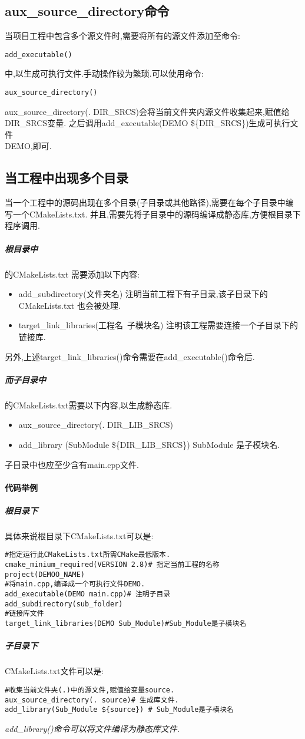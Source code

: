 \documentclass{ctexart}
\begin{document}
\subsection{aux\_source\_directory命令}
当项目工程中包含多个源文件时,需要将所有的源文件添加至命令:
\begin{verbatim}
add_executable()
\end{verbatim}
中,以生成可执行文件.手动操作较为繁琐.可以使用命令:
\begin{verbatim}
aux_source_directory()
\end{verbatim}
aux\_source\_directory(. DIR\_SRCS)会将当前文件夹内源文件收集起来,赋值给DIR\_SRCS变量.
之后调用add\_executable(DEMO \$\{DIR\_SRCS\})生成可执行文件\\DEMO,即可.
\subsection{当工程中出现多个目录}
当一个工程中的源码出现在多个目录(子目录或其他路径),需要在每个子目录中编写一个CMakeLists.txt. 并且,需要先将子目录中的源码编译成静态库,方便根目录下程序调用.
\subparagraph{根目录中}的CMakeLists.txt 需要添加以下内容:
\begin{itemize}
\item add\_subdirectory(文件夹名) 注明当前工程下有子目录,该子目录下的CMakeLists.txt 也会被处理.
\item target\_link\_libraries(工程名\ 子模块名) 注明该工程需要连接一个子目录下的链接库.
\end{itemize}
另外,上述target\_link\_libraries()命令需要在add\_executable()命令后.
\subparagraph{而子目录中}的CMakeLists.txt需要以下内容,以生成静态库.
\begin{itemize}
\item aux\_source\_directory(. DIR\_LIB\_SRCS)
\item add\_library (SubModule \$\{DIR\_LIB\_SRCS\}) SubModule 是子模块名.
\end{itemize}
子目录中也应至少含有main.cpp文件.
\paragraph{代码举例}
\subparagraph{根目录下}
具体来说根目录下CMakeLists.txt可以是:
\begin{verbatim}
#指定运行此CMakeLists.txt所需CMake最低版本.
cmake_minium_required(VERSION 2.8)# 指定当前工程的名称
project(DEMOO_NAME)
#将main.cpp,编译成一个可执行文件DEMO.
add_executable(DEMO main.cpp)# 注明子目录
add_subdirectory(sub_folder)
#链接库文件
target_link_libraries(DEMO Sub_Module)#Sub_Module是子模块名
\end{verbatim}
\subparagraph{子目录下}CMakeLists.txt文件可以是:
\begin{verbatim}
#收集当前文件夹(.)中的源文件,赋值给变量source.
aux_source_directory(. source)# 生成库文件.
add_library(Sub_Module ${source}) # Sub_Module是子模块名
\end{verbatim}
\emph{add\_library()命令可以将文件编译为静态库文件.}
\end{document}
